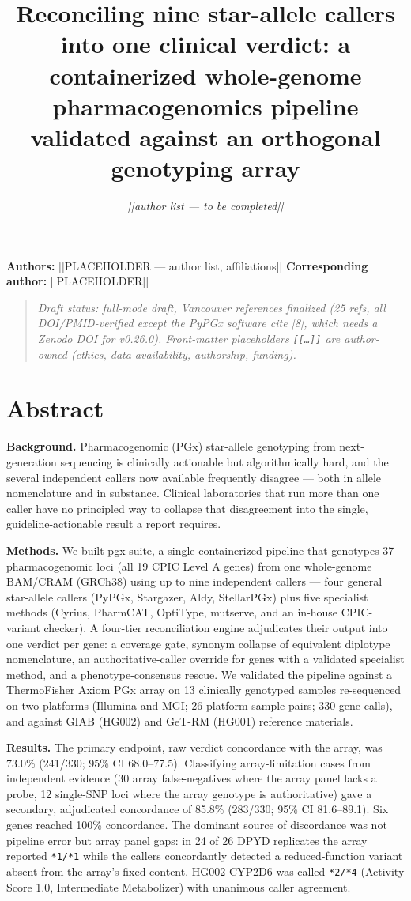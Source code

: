 \documentclass[11pt]{article}
\title{Reconciling nine star-allele callers into one clinical verdict: a containerized whole-genome pharmacogenomics pipeline validated against an orthogonal genotyping array}
\author{\textit{[[author list --- to be completed]]}}
\date{}
\begin{document}
\maketitle

\textbf{Authors:} [[PLACEHOLDER --- author list, affiliations]]
\textbf{Corresponding author:} [[PLACEHOLDER]]

\begin{quote}\small\itshape Draft status: full-mode draft, Vancouver references finalized (25 refs, all DOI/PMID-verified except the PyPGx software cite [8], which needs a Zenodo DOI for v0.26.0). Front-matter placeholders \texttt{[[…]]} are author-owned (ethics, data availability, authorship, funding).\end{quote}


\section*{Abstract}

\textbf{Background.} Pharmacogenomic (PGx) star-allele genotyping from next-generation sequencing is clinically actionable but algorithmically hard, and the several independent callers now available frequently disagree --- both in allele nomenclature and in substance. Clinical laboratories that run more than one caller have no principled way to collapse that disagreement into the single, guideline-actionable result a report requires.

\textbf{Methods.} We built pgx-suite, a single containerized pipeline that genotypes 37 pharmacogenomic loci (all 19 CPIC Level A genes) from one whole-genome BAM/CRAM (GRCh38) using up to nine independent callers --- four general star-allele callers (PyPGx, Stargazer, Aldy, StellarPGx) plus five specialist methods (Cyrius, PharmCAT, OptiType, mutserve, and an in-house CPIC-variant checker). A four-tier reconciliation engine adjudicates their output into one verdict per gene: a coverage gate, synonym collapse of equivalent diplotype nomenclature, an authoritative-caller override for genes with a validated specialist method, and a phenotype-consensus rescue. We validated the pipeline against a ThermoFisher Axiom PGx array on 13 clinically genotyped samples re-sequenced on two platforms (Illumina and MGI; 26 platform-sample pairs; 330 gene-calls), and against GIAB (HG002) and GeT-RM (HG001) reference materials.

\textbf{Results.} The primary endpoint, raw verdict concordance with the array, was 73.0\% (241/330; 95\% CI 68.0--77.5). Classifying array-limitation cases from independent evidence (30 array false-negatives where the array panel lacks a probe, 12 single-SNP loci where the array genotype is authoritative) gave a secondary, adjudicated concordance of 85.8\% (283/330; 95\% CI 81.6--89.1). Six genes reached 100\% concordance. The dominant source of discordance was not pipeline error but array panel gaps: in 24 of 26 DPYD replicates the array reported \texttt{*1/*1} while the callers concordantly detected a reduced-function variant absent from the array's fixed content. HG002 CYP2D6 was called \texttt{*2/*4} (Activity Score 1.0, Intermediate Metabolizer) with unanimous caller agreement.
\end{document}
